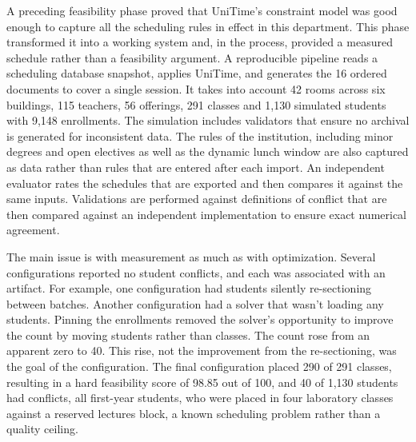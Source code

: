 \documentclass[journal]{IEEEtran}
\begin{document}
A preceding feasibility phase proved that UniTime’s constraint model was good enough to capture all the scheduling rules in effect in this department. This phase transformed it into a working system and, in the process, provided a measured schedule rather than a feasibility argument. A reproducible pipeline reads a scheduling database snapshot, applies UniTime, and generates the 16 ordered documents to cover a single session. It takes into account 42 rooms across six buildings, 115 teachers, 56 offerings, 291 classes and 1,130 simulated students with 9,148 enrollments. The simulation includes validators that ensure no archival is generated for inconsistent data. The rules of the institution, including minor degrees and open electives as well as the dynamic lunch window are also captured as data rather than rules that are entered after each import. An independent evaluator rates the schedules that are exported and then compares it against the same inputs. Validations are performed against definitions of conflict that are then compared against an independent implementation to ensure exact numerical agreement.

The main issue is with measurement as much as with optimization. Several configurations reported no student conflicts, and each was associated with an artifact. For example, one configuration had students silently re-sectioning between batches. Another configuration had a solver that wasn't loading any students. Pinning the enrollments removed the solver’s opportunity to improve the count by moving students rather than classes. The count rose from an apparent zero to 40. This rise, not the improvement from the re-sectioning, was the goal of the configuration. The final configuration placed 290 of 291 classes, resulting in a hard feasibility score of 98.85 out of 100, and 40 of 1{,}130 students had conflicts, all first-year students, who were placed in four laboratory classes against a reserved lectures block, a known scheduling problem rather than a quality ceiling.
\end{document}
